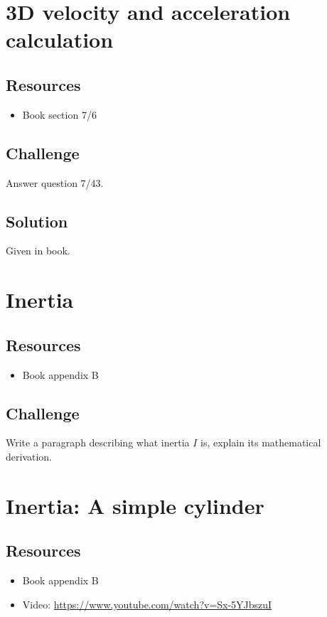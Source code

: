 \iffalse
\newpage
\section{3D velocity and acceleration calculation}

\subsection*{Resources}
\begin{itemize}
    \item Book section 7/6
\end{itemize}

\subsection*{Challenge}
Answer question 7/43.

\subsection*{Solution}
Given in book.




\newpage
\section{Inertia}

\subsection*{Resources}
\begin{itemize}
    \item Book appendix B
\end{itemize}

\subsection*{Challenge}
Write a paragraph describing what inertia $I$ is, explain its mathematical derivation.




\newpage
\section{Inertia: A simple cylinder}

\subsection*{Resources}
\begin{itemize}
    \item Book appendix B
    \item Video: \url{https://www.youtube.com/watch?v=Sx-5YJbszuI}
\end{itemize}

